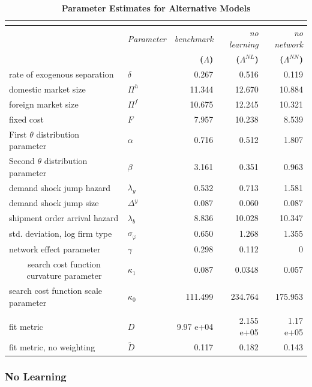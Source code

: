\begin{table}
    \centering
{\small 
\begin{tabular}{llrrr}
\multicolumn{5}{c}{\textbf{}} \\ \hline\hline
& \textit{Parameter} & \textit{benchmark} & \textit{no learning} & \textit{%
no network} \\ 
&  & \textbf{(}$\Lambda $\textbf{)} & \textbf{(}$\Lambda ^{NL}$\textbf{)} & 
\textbf{(}$\Lambda ^{NN}$\textbf{)} \\ \cline{2-5}
rate of exogenous separation & $\delta $ & 0.267 & 0.516 & 0.119 \\ 
domestic market size & $\Pi ^{h}$ & 11.344 & 12.670 & 10.884 \\ 
foreign market size & $\Pi ^{f}$ & 10.675 & 12.245 & 10.321 \\ 
fixed cost & $F$ & 7.957 & 10.238 & 8.539 \\ 
First $\theta $ distribution parameter & $\alpha $ & 0.716 & 0.512 & 1.807
\\ 
Second $\theta $ distribution parameter & $\beta $ & 3.161 & 0.351 & 0.963
\\ 
demand shock jump hazard & $\lambda _{y}$ & 0.532 & 0.713 & 1.581 \\ 
demand shock jump size & $\Delta ^{y}$ & 0.087 & 0.060 & 0.087 \\ 
shipment order arrival hazard & $\lambda _{b}$ & 8.836 & 10.028 & 10.347 \\ 
std. deviation, log firm type & $\sigma _{\varphi }$ & 0.650 & 1.268 & 1.355
\\ 
network effect parameter & $\gamma $ & 0.298 & 0.112 & 0 \\ 
\multicolumn{1}{c}{search cost function curvature parameter} & $\kappa _{1}$
& 0.087 & 0.0348 & 0.057 \\ 
search cost function scale parameter & $\kappa _{0}$ & 111.499 & 234.764 & 
175.953 \\ 
&  &  &  &  \\ 
fit metric & $D$ & 9.97 e+04 & 2.155 e+05 & 1.17 e+05 \\ 
fit metric, no weighting & $\widetilde{D}$ & 0.117 & 0.182 & 0.143 \\ \hline
\end{tabular}%
}
\caption{\textbf{Parameter Estimates for Alternative Models}}
\label{tab:alt_est}
\end{table}

\bigskip



\subsubsection{No Learning}

